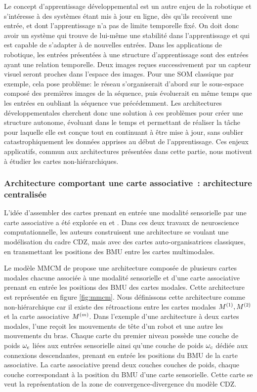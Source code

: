 \documentclass[../main]{subfiles}
\begin{document}
{Le concept d'apprentissage  développemental est un autre enjeu de la robotique et s'intéresse à des systèmes étant mis à jour en ligne, dès qu'ils recoivent une entrée, et dont l'apprentissage n'a pas de limite temporelle fixé. On doit donc avoir un système qui trouve de lui-même une stabilité dans l'apprentissage et qui est capable de s'adapter à de nouvelles entrées.
Dans les applications de robotique, les entrées présentées à une structure d'apprentissage sont des entrées ayant une relation temporelle. Deux images reçues successivement par un capteur visuel seront proches dans l'espace des images. Pour une SOM classique par exemple, cela pose problème: le réseau s'organiserait d'abord sur le sous-espace composé des premières images de la séquence, puis évoluerait en même temps que les entrées en oubliant la séquence vue précédemment.
Les architectures développementales cherchent donc une solution à ces problèmes pour créer une structure autonome, évoluant dans le temps et permettant de réaliser la tâche pour laquelle elle est conçue tout en continuant à être mise à jour, sans oublier catastrophiquement les données apprises au début de l'apprentissage.
Ces enjeux applicatifs, commun aux architectures présentées dans cette partie, nous motivent à étudier les cartes non-hiérarchiques.

\subsubsection{Architecture comportant une carte associative~: architecture centralisée}

L'idée d'assembler des cartes prenant en entrée une modalité sensorielle par une carte associative a été explorée en \cite{dominey13} et \cite{escobar-juarez_self-organized_2016}.
Dans ces deux travaux de neuroscience computationnelle, les auteurs construisent une architecture se voulant une modélisation du cadre CDZ, mais avec des cartes auto-organisatrices classiques, en transmettant les positions des BMU entre les cartes multimodales. 

Le modèle MMCM de \cite{dominey13} propose une architecture composée de plusieurs cartes modales chacune associée à une modalité sensorielle et d'une carte associative prenant en entrée les positions des BMU des cartes modales. Cette architecture est représentée en figure \ref{fig:mmcm}. 
Nous définissons cette architecture comme non-hiérarchique car il existe des rétroactions entre les cartes modales $M^{({1})},M^{({2})}$ et la carte associative $M^{({m})}$.
Dans l'exemple d'une architecture à deux cartes modales, l'une reçoit les mouvements de tête d'un robot et une autre les mouvements du bras.
Chaque carte du premier niveau possède une couche de poids $\omega_e$ liées aux entrées sensorielle ainsi qu'une couche de poids $ \omega_c$ dédiée aux connexions descendantes, prenant en entrée les positions du BMU de la carte associative.
La carte associative prend deux couches couches de poids, chaque couche correspondant à la position du BMU d'une carte sensorielle. Cette carte se veut la représentation de la zone de convergence-divergence du modèle CDZ.

}
\end{document}
